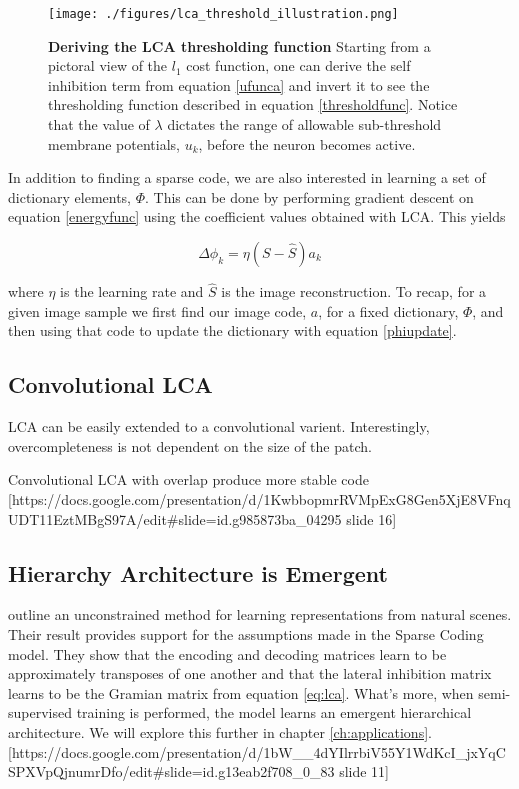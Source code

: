 \begin{figure}\label{lca_thresh}
\centering
\texttt{[image: ./figures/lca\_threshold\_illustration.png]}
\caption{\textbf{Deriving the LCA thresholding function} Starting from a pictoral view of the $l_{1}$ cost function, one can derive the self inhibition term from equation \eqref{ufunca} and invert it to see the thresholding function described in equation \eqref{thresholdfunc}. Notice that the value of $\lambda$ dictates the range of allowable sub-threshold membrane potentials, $u_{k}$, before the neuron becomes active.}
\end{figure}

In addition to finding a sparse code, we are also interested in learning a set of dictionary elements, $\Phi$. This can be done by performing gradient descent on equation \eqref{energyfunc} using the coefficient values obtained with LCA. This yields

\begin{equation}
  \Delta \phi_{k} = \eta (S - \hat{S}) a_{k}
\label{phiupdate}
\end{equation}

where $\eta$ is the learning rate and $\hat{S}$ is the image reconstruction. To recap, for a given image sample we first find our image code, $a$, for a fixed dictionary, $\Phi$, and then using that code to update the dictionary with equation \eqref{phiupdate}.

\subsection{Convolutional LCA}

LCA can be easily extended to a convolutional varient. Interestingly, overcompleteness is not dependent on the size of the patch.

Convolutional LCA with overlap produce more stable code [https://docs.google.com/presentation/d/1KwbbopmrRVMpExG8Gen5XjE8VFnqUDT11EztMBgS97A/edit#slide=id.g985873ba_04295 slide 16]

\subsection{Hierarchy Architecture is Emergent}
\citet{rolfe2013discriminative} outline an unconstrained method for learning representations from natural scenes. Their result provides support for the assumptions made in the Sparse Coding model. They show that the encoding and decoding matrices learn to be approximately transposes of one another and that the lateral inhibition matrix learns to be the Gramian matrix from equation \ref{eq:lca}. What's more, when semi-supervised training is performed, the model learns an emergent hierarchical architecture. We will explore this further in chapter \ref{ch:applications}.
[https://docs.google.com/presentation/d/1bW__4dYIlrrbiV55Y1WdKcI_jxYqCSPXVpQjnumrDfo/edit#slide=id.g13eab2f708_0_83 slide 11]

